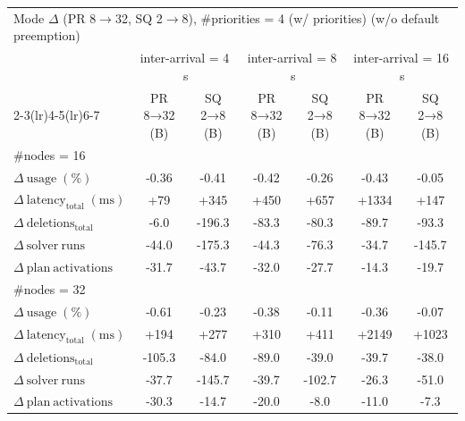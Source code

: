 \begin{tabular}{l c c c c c c}
\toprule
\multicolumn{7}{l}{Mode $\Delta$ (PR 8$\rightarrow$32, SQ 2$\rightarrow$8), \#priorities = 4 (w/ priorities) (w/o default preemption)} \\
\addlinespace[0.2em]
 & \multicolumn{2}{c}{inter-arrival = 4\,s} & \multicolumn{2}{c}{inter-arrival = 8\,s} & \multicolumn{2}{c}{inter-arrival = 16\,s} \\
\cmidrule(lr){2-3}\cmidrule(lr){4-5}\cmidrule(lr){6-7}
 & PR 8→32 (B) & SQ 2→8 (B) & PR 8→32 (B) & SQ 2→8 (B) & PR 8→32 (B) & SQ 2→8 (B) \\
\midrule
\multicolumn{7}{l}{\#nodes = 16} \\
\midrule
$\Delta\ \mathrm{usage}\;(\%)$ & -0.36 & -0.41 & -0.42 & -0.26 & -0.43 & -0.05 \\
$\Delta\ \mathrm{latency}_{\mathrm{total}}\;(\mathrm{ms})$ & +79 & +345 & +450 & +657 & +1334 & +147 \\
$\Delta\ \mathrm{deletions}_{\mathrm{total}}$ & -6.0 & -196.3 & -83.3 & -80.3 & -89.7 & -93.3 \\
$\Delta\ \mathrm{solver\ runs}$ & -44.0 & -175.3 & -44.3 & -76.3 & -34.7 & -145.7 \\
$\Delta\ \mathrm{plan\ activations}$ & -31.7 & -43.7 & -32.0 & -27.7 & -14.3 & -19.7 \\
\midrule
\multicolumn{7}{l}{\#nodes = 32} \\
\midrule
$\Delta\ \mathrm{usage}\;(\%)$ & -0.61 & -0.23 & -0.38 & -0.11 & -0.36 & -0.07 \\
$\Delta\ \mathrm{latency}_{\mathrm{total}}\;(\mathrm{ms})$ & +194 & +277 & +310 & +411 & +2149 & +1023 \\
$\Delta\ \mathrm{deletions}_{\mathrm{total}}$ & -105.3 & -84.0 & -89.0 & -39.0 & -39.7 & -38.0 \\
$\Delta\ \mathrm{solver\ runs}$ & -37.7 & -145.7 & -39.7 & -102.7 & -26.3 & -51.0 \\
$\Delta\ \mathrm{plan\ activations}$ & -30.3 & -14.7 & -20.0 & -8.0 & -11.0 & -7.3 \\
\bottomrule
\end{tabular}

